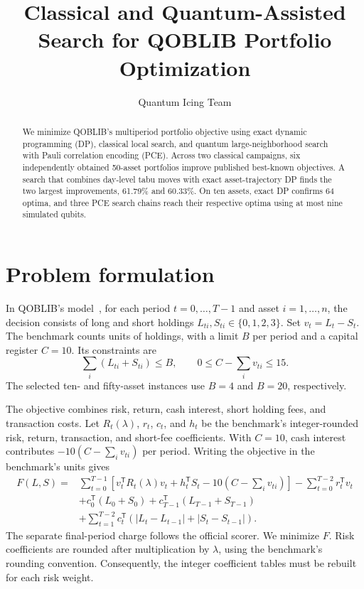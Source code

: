 \documentclass[a4paper]{article}
\title{Classical and Quantum-Assisted Search for QOBLIB Portfolio Optimization}
\author{Quantum Icing Team}
\date{}
\begin{document}
\maketitle

\begin{abstract}
We minimize QOBLIB's multiperiod portfolio objective using exact dynamic programming (DP), classical local
search, and quantum large-neighborhood search with Pauli correlation encoding (PCE).
Across two classical campaigns, six independently obtained 50-asset portfolios improve published best-known
objectives. A search that combines day-level tabu moves with exact asset-trajectory DP finds the two largest
improvements, 61.79\% and 60.33\%. On ten assets, exact DP confirms 64 optima, and three PCE search chains
reach their respective optima using at most nine simulated qubits.
\end{abstract}

\section{Problem formulation}

In QOBLIB's model~\cite{qoblib}, for each period \(t=0,\ldots,T-1\) and asset \(i=1,\ldots,n\), the decision consists of long and short holdings
\(L_{ti},S_{ti}\in\{0,1,2,3\}\). Set \(v_t=L_t-S_t\). The benchmark counts units of holdings, with a limit \(B\)
per period and a capital register \(C=10\). Its constraints are
\begin{equation}
\label{eq:constraints}
\sum_i(L_{ti}+S_{ti})\le B,\qquad
0\le C-\sum_i v_{ti}\le15 .
\end{equation}
The selected ten- and fifty-asset instances use \(B=4\) and \(B=20\), respectively.

The objective combines risk, return, cash interest, short holding fees, and transaction costs.
Let \(R_t(\lambda)\), \(r_t\), \(c_t\), and \(h_t\) be the benchmark's integer-rounded risk, return, transaction,
and short-fee coefficients. With \(C=10\), cash interest contributes \(-10(C-\sum_i v_{ti})\) per period.
Writing the objective in the benchmark's units gives
\begin{equation}
\label{eq:objective}
\begin{aligned}
F(L,S)={}&\sum_{t=0}^{T-1}
\left[v_t^\mathsf{T}R_t(\lambda)v_t+h_t^\mathsf{T}S_t
      -10\left(C-\sum_i v_{ti}\right)\right]
-\sum_{t=0}^{T-2}r_t^\mathsf{T}v_t\\
&+c_0^\mathsf{T}(L_0+S_0)+c_{T-1}^\mathsf{T}(L_{T-1}+S_{T-1})\\
&+\sum_{t=1}^{T-2}c_t^\mathsf{T}
\left(|L_t-L_{t-1}|+|S_t-S_{t-1}|\right).
\end{aligned}
\end{equation}
The separate final-period charge follows the official scorer. We minimize \(F\).
Risk coefficients are rounded after multiplication by \(\lambda\), using the benchmark's rounding convention.
Consequently, the integer coefficient tables must be rebuilt for each risk weight.
\end{document}

